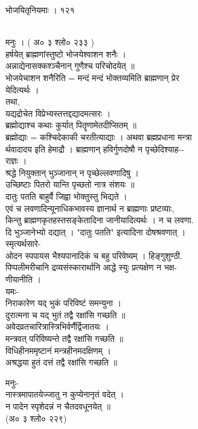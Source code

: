 \documentclass[11pt, openany]{book}
\begin{document}
{{{{{{{{{ }{ भोजयितृनियमाः । १२१}{\\
मनुः । ( अ० ३ श्लो० २३३ )\\
हर्षयेत् ब्राह्मणांस्तुष्टो भोजयेश्वाशन शनैः ।\\
अन्नाद्येनासक्कश्ञ्चैनान् गुणैश्च परिचोदयेत् ॥\\
भोजयेचाशन शनैरिति = मन्दं मन्दं भोक्तव्यमिति ब्राह्मणान् प्रेर\\
येदित्यर्थः ।\\
तथा,\\
यद्यद्रोचेत विप्रेभ्यस्तत्तद्दद्यादमत्सरः ।\\
ब्रह्मोद्याश्च कथाः कुर्यात् पितॄणामेतदीप्सितम् ॥\\
ब्रह्मोद्याः = कश्चिदेकाकी चरतीत्याद्याः । अथवा ब्रह्मप्रधाना मन्त्रा\\
र्थवादादय इति हेमाद्रौ । ब्राह्मणान् हविर्गुणदोषौ न पृच्छेदिश्याह-\/-\\
राज्ञः ।\\
श्रद्धे नियुक्तान् भुञ्जानान् न पृच्छेल्लवणादिषु ।\\
उच्छिष्टाः पितरो यान्ति पृच्छतो नात्र संशयः ॥\\
दातुः पतति बाहुर्वै जिह्वा भोक्तुस्तु भिद्यते ।\\
एवं च लवणादिन्यूनाधिकभावस्य ज्ञानार्थ न ब्राह्मणाः प्रष्टव्याः,\\
किन्तु ब्राह्मणकृतहस्तसङ्केतादिना जानीयादित्यर्थः । न च लवणा.\\
दि भुञ्जानेभ्यो दद्यात् । "दातुः पतति" इत्यादिना दोषश्रवणात् ।\\
स्मृत्यर्थसारे-\\
ओदन स्पपायस भैश्यपानादिकं च बहु परिवेष्यम् । हिङ्गुशुण्ठी.\\
पिप्पलीमरीचानि द्रव्यसंस्कारार्थानि आद्धे स्युः प्रत्यक्षेण न भक्ष-\\
णीयानीति ।\\
यमः-\\
निराकारेण यद् भुकं परिविष्टं समन्युना ।\\
दुरात्मना च यद् भुतं तद्वै रक्षांसि गच्छति ॥\\
अवेदव्रतचारित्रास्त्रिभिर्वर्णैर्द्विजातयः ।\\
मन्त्रवत् परिविष्यन्ते तद्वै रक्षांसि गच्छति ॥\\
विधिहीनममृष्टानं मन्त्रहीनमदक्षिणम् ।\\
अश्रद्धया हुतं दत्तं तद्वै रक्षांसि गच्छति ॥

{मनुः-\\
नास्त्रमापातयेज्जातु न कुप्येनानृतं वदेत् ।\\
न पादेन स्पृशेदन्नं न चैतदवधूनयेत् ॥\\
(अ० ३ श्लो० २२९)

}}}}}}}}}}
\end{document}

